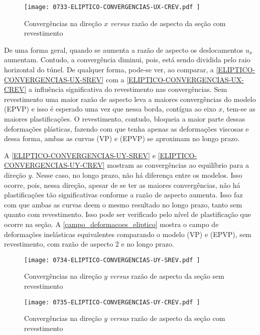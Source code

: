 \begin{figure}[H]
	\begin{center}
		\texttt{[image: 0733-ELIPTICO-CONVERGENCIAS-UX-CREV.pdf
		]}
	\end{center}
	\caption{\label{ELIPTICO-CONVERGENCIAS-UX-CREV}Convergências na direção $x$ \textit{versus} razão de aspecto da seção com revestimento}
\end{figure}

De uma forma geral, quando se aumenta a razão de aspecto os deslocamentos $u_x$ aumentam. Contudo, a convergência diminui, pois, está sendo dividida pelo raio horizontal do túnel. De qualquer forma, pode-se ver, ao comparar, a \autoref{ELIPTICO-CONVERGENCIAS-UX-SREV} com a \autoref{ELIPTICO-CONVERGENCIAS-UX-CREV} a influência significativa do revestimento nas convergências. Sem revestimento uma maior razão de aspecto leva a maiores convergências do modelo (EPVP) e isso é esperado uma vez que nessa borda, contígua ao eixo $x$, tem-se as maiores plastificações. O revestimento, contudo, bloqueia a maior parte dessas deformações plásticas, fazendo com que tenha apenas as deformações viscosas e dessa forma, ambas as curvas (VP) e (EPVP) se aproximam no longo prazo. 

A \autoref{ELIPTICO-CONVERGENCIAS-UY-SREV} e \autoref{ELIPTICO-CONVERGENCIAS-UY-CREV} mostram as convergências ao equilíbrio para a direção $y$. Nesse caso, no longo prazo, não há diferença entre os modelos. Isso ocorre, pois, nessa direção, apesar de se ter as maiores convergências, não há plastificações tão significativas conforme a razão de aspecto aumenta. Isso faz com que ambas as curvas deem o mesmo resultado no longo prazo, tanto sem quanto com revestimento. Isso pode ser verificado pelo nível de plastificação que ocorre na seção. A \autoref{campo_deformacoes_eliptico} mostra o campo de deformações inelásticas equivalentes comparando o modelo (VP) e (EPVP), sem revestimento, com razão de aspecto 2 e no longo prazo.

\begin{figure}[H]
	\begin{center}
		\texttt{[image: 0734-ELIPTICO-CONVERGENCIAS-UY-SREV.pdf
		]}
	\end{center}
	\caption{\label{ELIPTICO-CONVERGENCIAS-UY-SREV}Convergências na direção $y$ \textit{versus} razão de aspecto da seção sem revestimento}
\end{figure}

\begin{figure}[H]
	\begin{center}
		\texttt{[image: 0735-ELIPTICO-CONVERGENCIAS-UY-CREV.pdf
		]}
	\end{center}
	\caption{\label{ELIPTICO-CONVERGENCIAS-UY-CREV}Convergências na direção $y$ \textit{versus} razão de aspecto da seção com revestimento}
\end{figure}


